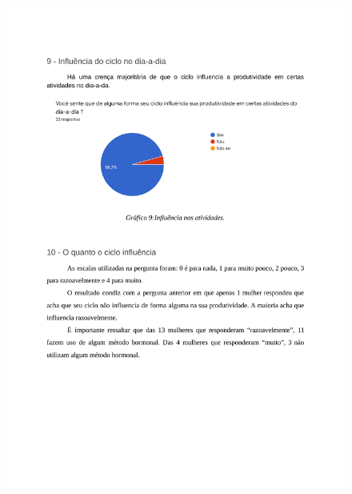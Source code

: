 \begin{apendicesenv}
    \begin{figure}[h]
        \centering
        \includegraphics[keepaspectratio=true,scale=0.7]{figuras/Tab7.pdf}
    \end{figure}
    

\end{apendicesenv}
